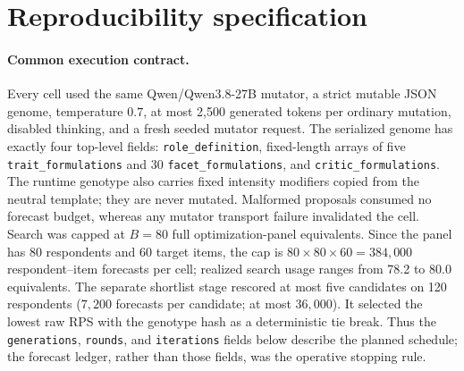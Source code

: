 \section{Reproducibility specification}
\label{app:reproducibility}

\paragraph{Common execution contract.}
Every cell used the same Qwen/Qwen3.8-27B mutator, a strict mutable JSON genome,
temperature $0.7$, at most 2,500 generated tokens per ordinary mutation,
disabled thinking, and a fresh seeded mutator request.  The serialized genome has
exactly four top-level fields: \texttt{role\_definition}, fixed-length arrays of five
\texttt{trait\_formulations} and 30 \texttt{facet\_formulations}, and
\texttt{critic\_formulations}.  The runtime genotype also carries fixed
intensity modifiers copied from the neutral template; they are never mutated.
Malformed proposals consumed no forecast budget, whereas any mutator transport
failure invalidated the cell.  Search was capped at $B=80$ full optimization-panel
equivalents. Since the panel has 80 respondents and 60 target items, the cap
is $80\times80\times60=384{,}000$ respondent--item forecasts per cell;
realized search usage ranges from 78.2 to 80.0 equivalents.  The
separate shortlist stage rescored at most five candidates on 120 respondents
($7{,}200$ forecasts per candidate; at most $36{,}000$).  It selected the
lowest raw RPS with the genotype hash as a deterministic tie break.  Thus the
\texttt{generations}, \texttt{rounds}, and \texttt{iterations} fields below
describe the planned schedule; the forecast ledger, rather than those fields,
was the operative stopping rule.

